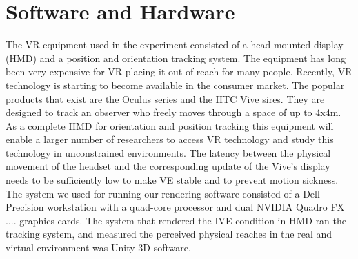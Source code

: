 \section{Software and Hardware}
The VR equipment used in the experiment consisted of a head-mounted display (HMD) and a position and orientation tracking system. The equipment has long been very expensive for VR placing it out of reach for many people. Recently, VR technology is starting to become available in the consumer market. The popular products that exist are the Oculus series and the HTC Vive sires. They are designed to track an observer who freely moves through a space of up to 4x4m. As a complete HMD for orientation and position tracking this equipment will enable a larger number of researchers to access VR technology and study this technology in unconstrained environments. The latency between the physical movement of the headset and the corresponding update of the Vive’s display needs to be sufficiently low to make VE stable and to prevent motion sickness.
The system we used for running our rendering software consisted of a Dell Precision workstation with a quad-core processor and dual NVIDIA Quadro FX .... graphics cards. The system that rendered the IVE condition in HMD ran the tracking system, and measured the perceived physical reaches in the real and virtual environment was Unity 3D software. 
 


